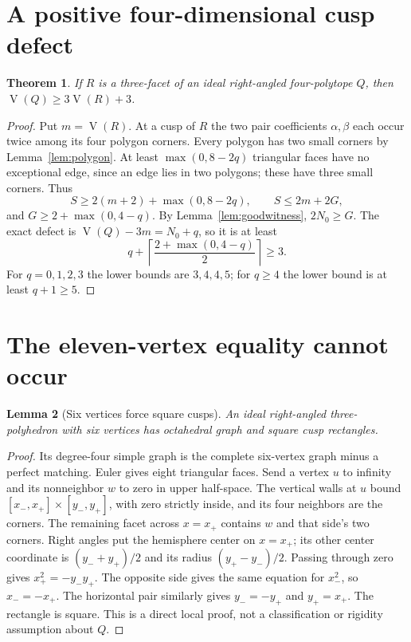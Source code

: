 \documentclass[11pt]{article}
\newtheorem{theorem}{Theorem}[section]
\newtheorem{lemma}[theorem]{Lemma}
\theoremstyle{remark}
\newcommand{\VV}{\operatorname{V}}
\begin{document}
\section{A positive four-dimensional cusp defect}\label{sec:defect}

\begin{theorem}\label{thm:plus3}
If $R$ is a three-facet of an ideal right-angled four-polytope $Q$,
then $\VV(Q)\ge3\VV(R)+3$.
\end{theorem}
\begin{proof}
Put $m=\VV(R)$. At a cusp of $R$ the two pair coefficients
$\alpha,\beta$ each occur twice among its four polygon corners.
Every polygon has two small corners by Lemma~\ref{lem:polygon}.
At least $\max(0,8-2q)$ triangular faces have no exceptional edge,
since an edge lies in two polygons; these have three small corners.
Thus
\[
 S\ge2(m+2)+\max(0,8-2q),\qquad S\le2m+2G,
\]
and $G\ge2+\max(0,4-q)$. By Lemma~\ref{lem:goodwitness}, $2N_0\ge G$.
The exact defect is $\VV(Q)-3m=N_0+q$, so it is at least
\[
 q+\left\lceil\frac{2+\max(0,4-q)}2\right\rceil\ge3.
\]
For $q=0,1,2,3$ the lower bounds are $3,4,4,5$; for $q\ge4$
the lower bound is at least $q+1\ge5$.
\end{proof}

\section{The eleven-vertex equality cannot occur}\label{sec:equality}

\begin{lemma}[Six vertices force square cusps]\label{lem:octasquare}
An ideal right-angled three-polyhedron with six vertices has octahedral
graph and square cusp rectangles.
\end{lemma}
\begin{proof}
Its degree-four simple graph is the complete six-vertex graph minus a
perfect matching. Euler gives eight triangular faces. Send a vertex
$u$ to infinity and its nonneighbor $w$ to zero in upper half-space.
The vertical walls at $u$ bound
$[x_-,x_+]\times[y_-,y_+]$, with zero strictly inside, and its four
neighbors are the corners. The remaining facet across $x=x_+$
contains $w$ and that side's two corners. Right angles put the
hemisphere center on $x=x_+$; its other center coordinate is
$(y_-+y_+)/2$ and its radius $(y_+-y_-)/2$. Passing through zero
gives $x_+^2=-y_-y_+$. The opposite side gives the same equation
for $x_-^2$, so $x_-=-x_+$. The horizontal pair similarly gives
$y_-=-y_+$ and $y_+=x_+$. The rectangle is square. This is a direct
local proof, not a classification or rigidity assumption about $Q$.
\end{proof}
\end{document}
